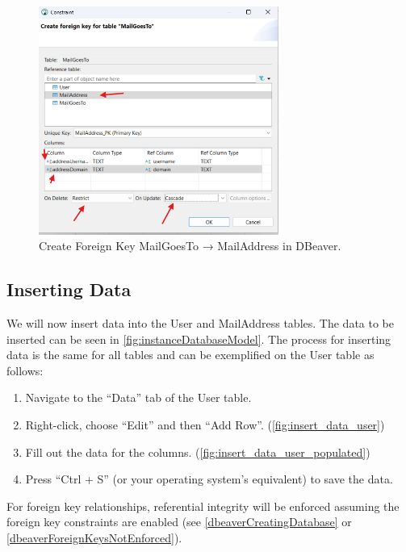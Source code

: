\documentclass[a4paper,11pt,oneside]{article}
\begin{document}
\begin{sloppypar}
\begin{figure}[!htb]
  \centering
  \includegraphics[width=0.7\textwidth]{dbeaver/create_foreign_key_mail_goes_to_mail_address.png}
  \caption{Create Foreign Key MailGoesTo → MailAddress in DBeaver.}
  \label{fig:create_foreign_key_mail_goes_to_mail_address}
\end{figure}


\subsection{Inserting Data}
\label{dbeaverInsertingData}

We will now insert data into the User and MailAddress tables. The data to be inserted can be seen in \autoref{fig:instanceDatabaseModel}. The process for inserting data is the same for all tables and can be exemplified on the User table as follows:

\begin{enumerate}
  \item Navigate to the ``Data'' tab of the User table.
  \item Right-click, choose ``Edit'' and then ``Add Row''. (\autoref{fig:insert_data_user})
  \item Fill out the data for the columns. (\autoref{fig:insert_data_user_populated})
  \item Press ``Ctrl + S'' (or your operating system's equivalent) to save the data.
\end{enumerate}

For foreign key relationships, referential integrity will be enforced assuming the foreign key constraints are enabled (see \autoref{dbeaverCreatingDatabase} or \autoref{dbeaverForeignKeysNotEnforced}).


\end{sloppypar}
\end{document}
